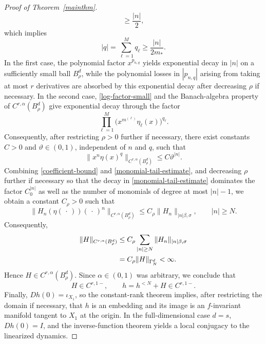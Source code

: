 \documentclass{amsart}
\theoremstyle{plain}
\theoremstyle{definition}
\begin{document}
\begin{proof}[Proof of Theorem~\ref{mainthm}]
\begin{equation}
    \geq \frac{|n|}{2},
\end{equation}
which implies
\begin{equation}
    |q|
    =
    \sum_{\ell=1}^M q_\ell
    \geq
    \frac{|n|}{2m_*}.
\end{equation}
In the first case, the polynomial factor $x^{p_{n,q}}$ yields
exponential decay in $|n|$ on a sufficiently small ball
$B_\rho^d$, while the polynomial losses in $|p_{n,q}|$ arising from
taking at most $r$ derivatives are absorbed by this exponential
decay after decreasing $\rho$ if necessary. In the second case,
\eqref{log-factor-small} and the Banach-algebra property of
$C^{r,\alpha}(B_\rho^d)$ give exponential decay through the factor
\begin{equation}
    \prod_{\ell=1}^M
    \bigl(x^{m^{(\ell)}}\eta_\ell(x)\bigr)^{q_\ell}.
\end{equation}
Consequently, after restricting $\rho>0$ further if necessary,
there exist constants $C>0$ and $\vartheta\in(0,1)$, independent
of $n$ and $q$, such that
\begin{equation}
    \bigl\|
        x^n\eta(x)^q
    \bigr\|_{C^{r,\alpha}(B_\rho^d)}
    \leq
    C\vartheta^{|n|}.
\end{equation}
Combining \eqref{coefficient-bound} and
\eqref{monomial-tail-estimate}, and decreasing $\rho$ further if
necessary so that the decay in \eqref{monomial-tail-estimate}
dominates the factor $C_0^{|n|}$ as well as the number of
monomials of degree at most $|n|-1$, we obtain a constant
$C_\rho>0$ such that
\begin{equation}
    \bigl\|
        H_n(\eta(\,\cdot\,))(\,\cdot\,)^n
    \bigr\|_{C^{r,\alpha}(B_\rho^d)}
    \leq
    C_\rho
    \|H_n\|_{|n|\beta,\sigma},
    \qquad |n|\geq N.
    \label{tail-regularity-estimate}
\end{equation}
Consequently,
\begin{align}
    \|H\|_{C^{r,\alpha}(B_\rho^d)}
    &\leq
    C_\rho
    \sum_{|n|\geq N}
        \|H_n\|_{|n|\beta,\sigma}
    \notag\\
    &=
    C_\rho\|H\|_{\Gamma_N^d}
    <\infty.
    \label{tail-holder-bound}
\end{align}
Hence $H\in C^{r,\alpha}(B_\rho^d)$. Since
$\alpha\in(0,1)$ was arbitrary, we conclude that
\begin{equation}
    H\in C^{r,1-},
    \qquad
    h=h^{<N}+H\in C^{r,1-}.
\end{equation}
Finally, $Dh(0)=\iota_{X_1}$, so the constant-rank theorem implies,
after restricting the domain if necessary, that $h$ is an embedding
and its image is an $f$-invariant manifold tangent to $X_1$ at the
origin. In the full-dimensional case $d=s$, $Dh(0)=I$, and the
inverse-function theorem yields a local conjugacy to the linearized
dynamics.
\end{proof}
\end{document}
